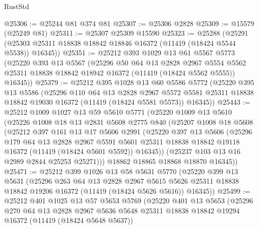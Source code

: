 \begin{lexlean}{RustStd}
\begin{coremodule}
@25306 := @25244 @81 @374 @81
@25307 := @25306 @2828
@25309 := @15579 (@25249 @81)
@25311 := @25307 @25309 @15590
@25323 := @25288
    (@25291 (@25303 @25311 @18838 @18842 @18846 @16372 (@11419 (@18424 @5544 @5538)) @16345))
@25351 := @25212
    @393
    @1029
    @13
    @61
    @5567
    @5773
    (@25220
      @393
      @13
      @5567
      (@25296
        @50
        @64
        @13
        @2828
        @2967
        @5554
        @5562
        @25311
        @18838
        @18842
        @18942
        @16372
        (@11419 (@18424 @5562 @5555))
        @16345))
@25379 := @25212
    @395
    @1028
    @13
    @60
    @5586
    @5772
    (@25220
      @395
      @13
      @5586
      (@25296
        @110
        @64
        @13
        @2828
        @2967
        @5572
        @5581
        @25311
        @18838
        @18842
        @19030
        @16372
        (@11419 (@18424 @5581 @5573))
        @16345))
@25443 := @25212
    @1009
    @1027
    @13
    @59
    @5610
    @5771
    (@25220
      @1009
      @13
      @5610
      (@25226
        @1008
        @18
        @13
        @2831
        @5608
        @2775
        @840
        (@25207
          @1008
          @18
          @5608
          (@25212
            @397
            @161
            @13
            @17
            @5606
            @2991
            (@25220
              @397
              @13
              @5606
              (@25296
                @179
                @64
                @13
                @2828
                @2967
                @5591
                @5601
                @25311
                @18838
                @18842
                @19118
                @16372
                (@11419 (@18424 @5601 @5592))
                @16345))
            (@25237 @103 @13 @16 @2989 @2844 @25253 @25271)))
        @18862
        @18865
        @18868
        @18870
        @16345))
@25471 := @25212
    @399
    @1026
    @13
    @58
    @5631
    @5770
    (@25220
      @399
      @13
      @5631
      (@25296
        @263
        @64
        @13
        @2828
        @2967
        @5615
        @5626
        @25311
        @18838
        @18842
        @19206
        @16372
        (@11419 (@18424 @5626 @5616))
        @16345))
@25499 := @25212
    @401
    @1025
    @13
    @57
    @5653
    @5769
    (@25220
      @401
      @13
      @5653
      (@25296
        @270
        @64
        @13
        @2828
        @2967
        @5636
        @5648
        @25311
        @18838
        @18842
        @19294
        @16372
        (@11419 (@18424 @5648 @5637))

\end{coremodule}
\end{lexlean}
